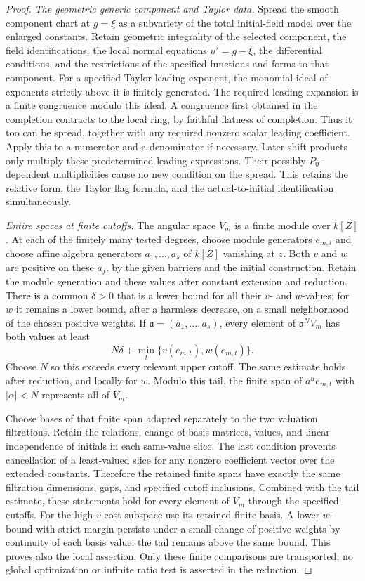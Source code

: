 \begin{proof}
\emph{The geometric generic component and Taylor data.}
Spread the smooth component chart at $g=\xi$ as a subvariety of the total
initial-field model over the enlarged constants.  Retain geometric
integrality of the selected component, the field identifications, the
local normal equations $u'=g-\xi$, the differential conditions, and the
restrictions of the specified functions and forms to that component.
For a specified Taylor leading exponent, the monomial ideal of exponents
strictly above it is finitely generated.  The required leading expansion
is a finite congruence modulo this ideal.  A congruence first obtained in
the completion contracts to the local ring, by faithful flatness of
completion.  Thus it too can be spread, together with any required nonzero
scalar leading coefficient.  Apply this to a numerator and a denominator
if necessary.  Later shift products only multiply these predetermined
leading expressions.  Their possibly $P_0$-dependent multiplicities cause
no new condition on the spread.  This retains the relative form, the
Taylor flag formula, and the actual-to-initial identification simultaneously.

\emph{Entire spaces at finite cutoffs.}
The angular space $V_m$ is a finite module over $k[Z]$.  At each of the
finitely many tested degrees, choose module generators $e_{m,t}$ and
choose affine algebra generators $a_1,\ldots,a_s$ of $k[Z]$ vanishing at
$z$.  Both $v$ and $w$ are positive on these $a_j$, by the given barriers
and the initial construction.  Retain the module generation and these
values after constant extension and reduction.  There is a common
$\delta>0$ that is a lower bound for all their $v$- and $w$-values;
for $w$ it remains a lower bound, after a harmless decrease, on a small
neighborhood of the chosen positive weights.  If
$\mathfrak a=(a_1,\ldots,a_s)$, every element of
$\mathfrak a^NV_m$ has both values at least
\[
 N\delta+\min_t\{v(e_{m,t}),w(e_{m,t})\}.
\]
Choose $N$ so this exceeds every relevant upper cutoff.  The same estimate
holds after reduction, and locally for $w$.  Modulo this tail, the finite
span of $a^\alpha e_{m,t}$ with $|\alpha|<N$ represents all of $V_m$.

Choose bases of that finite span adapted separately to the two valuation
filtrations.  Retain the relations, change-of-basis matrices, values, and
linear independence of initials in each same-value slice.  The last
condition prevents cancellation of a least-valued slice for any nonzero
coefficient vector over the extended constants.  Therefore the retained
finite spans have exactly the same filtration dimensions, gaps, and
specified cutoff inclusions.  Combined with the tail estimate, these
statements hold for every element of $V_m$ through the specified cutoffs.
For the high-$v$-cost subspace use its retained finite basis.  A lower
$w$-bound with strict margin persists under a small change of positive
weights by continuity of each basis value; the tail remains above the
same bound.  This proves also the local assertion.  Only these finite
comparisons are transported; no global optimization or infinite ratio
test is asserted in the reduction.
\end{proof}

